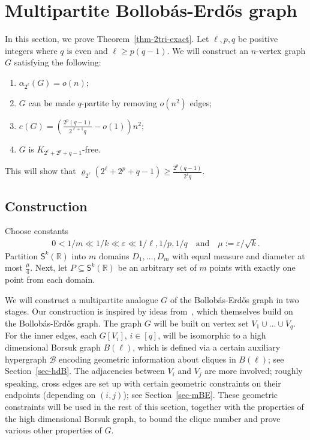 \documentclass[11pt, a4paper]{article}
\newcounter{propcounter}
\newcommand{\COMMENT}[1]{}
\renewcommand{\COMMENT}{\footnote}
\theoremstyle{definition}
\def\al{{\alpha}}
\def\eps{{\varepsilon}}
\newcommand{\cB}{\mathcal{B}}
\newcommand{\sS}{\mathsf{S}}
\newcommand{\sR}{\mathbb{R}}
\begin{document}


\section{Multipartite Bollob\'as-Erd\H{o}s graph}\label{sec-LB-Thm1}
In this section, we prove Theorem~\ref{thm-2tri-exact}. Let $\ell,p,q$ be positive integers where $q$ is even and $\ell \geq p(q-1)$. We will construct an $n$-vertex graph $G$ satisfying the following:
\begin{enumerate}[label = {\bfseries \Alph{propcounter}\arabic{enumi}}]
	\item\label{it:MBE-ind} $\al_{2^\ell}(G)= o(n)$;
	\item\label{it:MBE-inner} $G$ can be made $q$-partite by removing $o(n^2)$ edges;
	\item\label{it:MBE-edges} $e(G)=\left(\frac{2^p(q-1)}{2^{\ell+1} q}-o(1)\right)n^2$;
	\item\label{it:MBE-clique} $G$ is $K_{2^\ell+2^p+q-1}$-free.
\end{enumerate}
This will show that $\varrho_{2^\ell}(2^\ell+2^p+q-1) \geq \frac{2^p(q-1)}{2^\ell q}$. 


\subsection{Construction}
Choose constants%
\begin{align}
0 < 1/m \ll 1/k \ll \eps \ll 1/\ell,1/p,1/q \quad\text{and}\quad\mu:=\eps/\sqrt{k}.
\end{align}
Partition $\sS^{k}(\sR)$ into $m$ domains $D_1,\ldots,D_m$ with equal measure and  diameter at most $\frac{\mu}{4}$. Next, let $P\subseteq \sS^{k}(\sR)$ be an arbitrary set of $m$ points with exactly one point from each domain. 

We will construct a multipartite analogue $G$ of the Bollob\'as-Erd\H{o}s graph in two stages. Our construction is inspired by ideas from~\cite{BL-1,BL-2, Rodl}, which themselves build on the Bollob\'as-Erd\H os graph. The graph $G$ will be built on vertex set $V_1\cup\ldots\cup V_q$. For the inner edges, each $G[V_i]$, $i\in [q]$, will be isomorphic to a high dimensional Borsuk graph $B(\ell)$, which is defined via a certain auxiliary hypergraph $\cB$ encoding geometric information about cliques in $B(\ell)$; see Section~\ref{sec-hdB}. The adjacencies between $V_i$ and $V_j$ are more involved; roughly speaking, cross edges are set up with certain geometric constraints on their endpoints (depending on $(i,j)$); see Section~\ref{sec-mBE}. These geometric constraints will be used in the rest of this section, together with the properties of the high dimensional Borsuk graph, to bound the clique number and prove various other properties of $G$.
\end{document}
